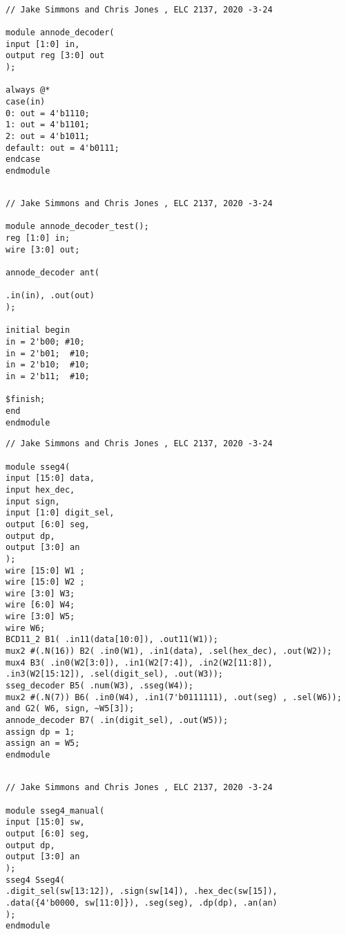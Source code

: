 \documentclass[11pt]{article}
\begin{document}
\begin{lstlisting}[style=Verilog,caption= Annode Decoder Source File,label=code:ex ]

// Jake Simmons and Chris Jones , ELC 2137, 2020 -3-24

module annode_decoder(
input [1:0] in,
output reg [3:0] out
);

always @*
case(in)
0: out = 4'b1110;
1: out = 4'b1101;
2: out = 4'b1011;
default: out = 4'b0111;
endcase
endmodule

\end{lstlisting}

\begin{lstlisting}[style=Verilog,caption= Annode Decoder Test Bench Code,label=code:ex ]

// Jake Simmons and Chris Jones , ELC 2137, 2020 -3-24

module annode_decoder_test();
reg [1:0] in;
wire [3:0] out;

annode_decoder ant(

.in(in), .out(out)
);

initial begin
in = 2'b00; #10;
in = 2'b01;  #10;
in = 2'b10;  #10;
in = 2'b11;  #10;

$finish;
end
endmodule

\end{lstlisting}


\begin{lstlisting}[style=Verilog,caption= Sseg4 Source File,label=code:ex ]
// Jake Simmons and Chris Jones , ELC 2137, 2020 -3-24

module sseg4(
input [15:0] data,
input hex_dec,
input sign,
input [1:0] digit_sel,
output [6:0] seg,
output dp,
output [3:0] an
);
wire [15:0] W1 ;
wire [15:0] W2 ;
wire [3:0] W3;
wire [6:0] W4;
wire [3:0] W5;
wire W6;
BCD11_2 B1( .in11(data[10:0]), .out11(W1));
mux2 #(.N(16)) B2( .in0(W1), .in1(data), .sel(hex_dec), .out(W2));
mux4 B3( .in0(W2[3:0]), .in1(W2[7:4]), .in2(W2[11:8]), .in3(W2[15:12]), .sel(digit_sel), .out(W3));
sseg_decoder B5( .num(W3), .sseg(W4));
mux2 #(.N(7)) B6( .in0(W4), .in1(7'b0111111), .out(seg) , .sel(W6));
and G2( W6, sign, ~W5[3]);
annode_decoder B7( .in(digit_sel), .out(W5));
assign dp = 1;
assign an = W5;
endmodule


\end{lstlisting}



\begin{lstlisting}[style=Verilog,caption=Sseg4 Manual Source File,label=code:ex ]
// Jake Simmons and Chris Jones , ELC 2137, 2020 -3-24

module sseg4_manual(
input [15:0] sw,
output [6:0] seg,
output dp,
output [3:0] an
);
sseg4 Sseg4(
.digit_sel(sw[13:12]), .sign(sw[14]), .hex_dec(sw[15]),
.data({4'b0000, sw[11:0]}), .seg(seg), .dp(dp), .an(an)
);
endmodule


\end{lstlisting}
\end{document}
